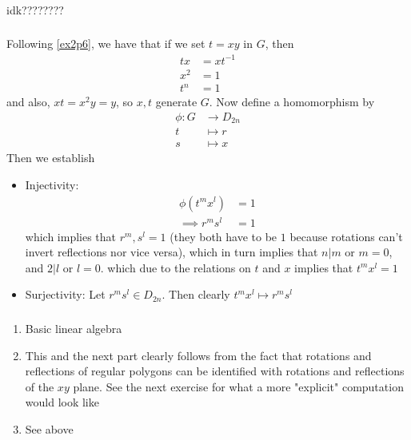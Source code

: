 \documentclass{article}
\newcommand{\inv}[1]{ {#1}^{-1} }
\begin{document}
\subsubsection{}\label{ex6p23}
idk????????
\subsubsection{}\label{ex6p24}
Following \ref{ex2p6}, we have that if we set $t=xy$ in $G$, then
\begin{align*}
tx &= x\inv{t}\\
x^2 &= 1\\
t^n &= 1
\end{align*}
and also, $xt = x^2y =y$, so $x,t$ generate $G$. Now define a homomorphism by
\begin{align*}
\phi: G &\to D_{2n}\\
t &\mapsto r\\
s &\mapsto x
\end{align*}
Then we establish
\begin{itemize}
\item Injectivity:
\begin{align*}
\phi(t^mx^l) &= 1\\
\implies r^ms^l &= 1
\end{align*}
which implies that $r^m,s^l=1$ (they both have to be $1$ because rotations can't invert reflections nor vice versa), which in turn implies that $n|m$ or $m=0$, and $2|l$ or $l=0$. which due to the relations on $t$ and $x$ implies that $t^mx^l = 1$
\item Surjectivity:
Let $r^ms^l \in D_{2n}$. Then clearly $t^mx^l \mapsto r^ms^l$
\end{itemize}
\subsubsection{}\label{ex6p25}
\begin{enumerate}
\item Basic linear algebra
\item This and the next part clearly follows from the fact that rotations and reflections of regular polygons can be identified with rotations and reflections of the $xy$ plane. See the next exercise for what a more "explicit" computation would look like
\item See above
\end{enumerate}
\end{document}
